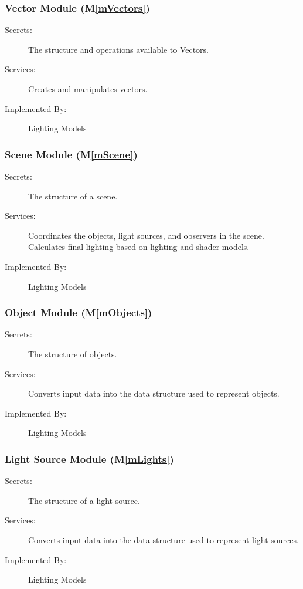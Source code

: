 \documentclass[12pt, titlepage]{article}
\newcommand{\mref}[1]{M\ref{#1}}
\begin{document}
\subsubsection{Vector Module (\mref{mVectors})}
\begin{description}
	\item[Secrets:]The structure and operations available to Vectors.
	\item[Services:]Creates and manipulates vectors.
	\item[Implemented By:] Lighting Models
\end{description}

\subsubsection{Scene Module (\mref{mScene})}
\begin{description}
	\item[Secrets:]The structure of a scene.
	\item[Services:]Coordinates the objects, light sources, and observers in 
	the scene. Calculates final lighting based on lighting and shader models.
	\item[Implemented By:] Lighting Models
\end{description}

\subsubsection{Object Module (\mref{mObjects})}
\begin{description}
	\item[Secrets:]The structure of objects.
	\item[Services:]Converts input data into the data structure used to 
	represent objects.
	\item[Implemented By:] Lighting Models
\end{description}

\subsubsection{Light Source Module (\mref{mLights})}
\begin{description}
	\item[Secrets:]The structure of a light source.
	\item[Services:]Converts input data into the data structure used to 
	represent light sources.
	\item[Implemented By:] Lighting Models
\end{description}
\end{document}
